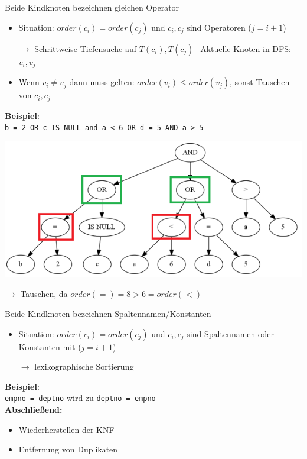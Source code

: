 \documentclass{beamer}
\begin{document}
\begin{frame}[fragile]{Beide Kindknoten bezeichnen gleichen Operator}
\begin{itemize}
\item Situation: $order(c_i) = order(c_j)$ und $c_i,c_j$ sind Operatoren ($j = i + 1$)
\item[$\to$] Schrittweise Tiefensuche auf $T(c_i), T(c_j)\ \ $ Aktuelle Knoten in DFS: $v_i,v_j$
\item Wenn $v_i \neq v_j$ dann muss gelten: $order(v_i) \leq order(v_j)$, sonst Tauschen von $c_i,c_j$
\end{itemize}
\textbf{Beispiel}:\\

\verb|b = 2 OR c IS NULL and a < 6 OR d = 5 AND a > 5|
\begin{center}
\includegraphics[scale=0.27]{sort_step2.png}
\end{center}

$\to$ Tauschen, da $order(=) = 8 > 6 = order(<) $\\
\end{frame}

\begin{frame}[fragile]{Beide Kindknoten bezeichnen Spaltennamen/Konstanten}
\begin{itemize}
\item Situation: $order(c_i) = order(c_j)$ und $c_i,c_j$ sind Spaltennamen oder Konstanten mit ($j = i + 1$)
\item[$\to$] lexikographische Sortierung
\end{itemize}
\textbf{Beispiel}:\\

\verb|empno = deptno| wird zu \verb|deptno = empno|\\
\vspace{4mm}
\textbf{Abschließend:}
\begin{itemize}
\item Wiederherstellen der KNF 
\item Entfernung von Duplikaten 
\end{itemize}
\end{frame}
\end{document}
